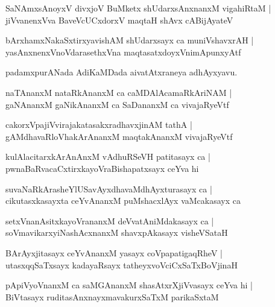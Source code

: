 \documentclass[twoside,12pt,openright]{book}
\newcounter{shloka}[chapter]
\begin{document}
\begin{shloka}
SaNAmxsAnoyxV divxjoV BuMketx shUdarxsAnxnanxM vigahiRtaM |\\
jiVvanenxVva BaveVcUCxdorxV maqtaH shAvx cABijAyateV 
\end{shloka}

\begin{shloka}
bArxhamxNakaSxtirxyavishAM shUdarxsayx ca muniVshavxrAH |\\
yasAnxnenxVnoVdarasethxVna maqtasatxdoyxVnimApunxyAtf
\end{shloka}

\begin{center}
padamxpurANada AdiKaMDada aivatAtxraneya adhAyxyavu.
\end{center}

\begin{shloka}
naTAnanxM nataRkAnanxM ca caMDAlAcamaRkAriNAM |\\
gaNAnanxM gaNikAnanxM ca SaDananxM ca vivajaRyeVtf 
\end{shloka}

\begin{shloka}
cakorxVpajiVvirajakatasakxradhavxjinAM tathA |\\
gAMdhavaRloVhakArAnanxM maqtakAnanxM vivajaRyeVtf 
\end{shloka}

\begin{shloka}
kulAlacitarxkArAnAnxM vAdhuRSeVH patitasayx ca |\\
pwnaBaRvacaCxtirxkayoVraBishapatxsayx ceYva hi
\end{shloka}

\begin{shloka}
suvaNaRkArasheYlUSavAyxdhavaMdhAyxturasayx ca |\\
cikutasxkasayxta ceYvAnanxM puMshacxlAyx vaMcakasayx ca 
\end{shloka}

\begin{shloka}
setxVnanAsitxkayoVrananxM deVvatAniMdakasayx ca |\\
soVmavikarxyiNashAcxnanxM shavxpAkasayx visheVSataH 
\end{shloka}

\begin{shloka}
BArAyxjitasayx ceYvAnanxM yasayx coVpapatigaqRheV |\\
utasxqqSaTxsayx kadayaRsayx tatheyxvoVciCxSaTxBoVjinaH 
\end{shloka}

\begin{shloka}
pApiVyoVnanxM ca saMGAnanxM shasAtxrXjiVvasayx ceYva hi |\\
BiVtasayx ruditasAnxnayxmavakurxSaTxM parikaSxtaM 
\end{shloka}
\end{document}
